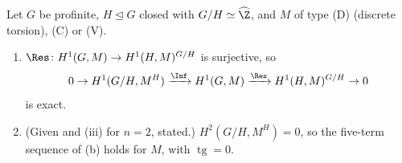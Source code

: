 \begin{proposition}\label{prop:cohomology:inf-res-zhat}
Let $G$ be profinite, $H\trianglelefteq G$ closed with $G/H\simeq\widehat\Z$, and $M$ of type (D) (discrete torsion), (C) or (V).
\begin{enumerate}[label=(\roman*)]
\item $\Res\colon H^1(G,M)\to H^1(H,M)^{G/H}$ is surjective, so
\[
0\to H^1(G/H,M^H)\xrightarrow{\Inf}H^1(G,M)\xrightarrow{\Res}H^1(H,M)^{G/H}\to0
\]
is exact.
\item (Given  and (iii) for $n=2$, stated.) $H^2(G/H,M^H)=0$, so the five-term sequence of
(b) holds for $M$, with $\operatorname{tg}=0$.
\end{enumerate}
\end{proposition}

